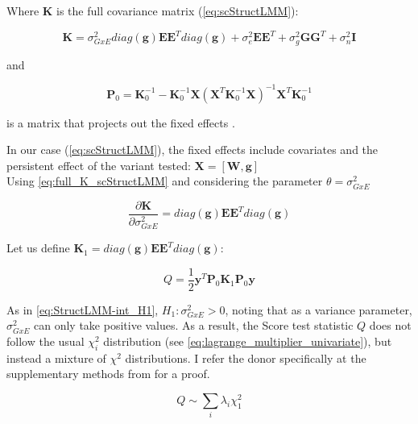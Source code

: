 Where $\mathbf{K}$ is the full covariance matrix (\eqref{eq:scStructLMM}):

\begin{equation}\label{eq:full_K_scStructLMM}
    \mathbf{K} = \sigma_{GxE}^2diag(\mathbf{g})\mathbf{E}\mathbf{E}^Tdiag(\mathbf{g}) +  \sigma_e^2 \mathbf{E}\mathbf{E}^T + \sigma_g^2 \mathbf{G}\mathbf{G}^T+ \sigma_n^2 \mathbf{I}
\end{equation}

and 

\begin{equation}
    \mathbf{P}_0 = \mathbf{K}_0^{-1}-\mathbf{K}_0^{-1}\mathbf{X}(\mathbf{X}^T\mathbf{K}_0^{-1}\mathbf{X})^{-1}\mathbf{X}^T\mathbf{K}_0^{-1}
\end{equation}

is a matrix that projects out the fixed effects \cite{lippert2011fast, lippert2014greater}.

In our case (\eqref{eq:scStructLMM}), the fixed effects include covariates and the persistent effect of the variant tested: $\mathbf{X} = [\mathbf{W}, \mathbf{g}]$\\

Using \eqref{eq:full_K_scStructLMM} and considering the parameter $\theta = \sigma_{GxE}^2$

\begin{equation}
    \frac{\partial \mathbf{K}}{\partial \sigma_{GxE}^2} = diag(\mathbf{g})\mathbf{E}\mathbf{E}^Tdiag(\mathbf{g})
\end{equation}

Let us define $\mathbf{K}_1 = diag(\mathbf{g})\mathbf{E}\mathbf{E}^Tdiag(\mathbf{g})$:

\begin{equation}
    Q = \frac{1}{2}\mathbf{y}^T\mathbf{P}_0 \mathbf{K}_1\mathbf{P}_0 \mathbf{y} 
\end{equation}

As in \eqref{eq:StructLMM-int_H1}, $H_1: \sigma_{GxE}^2>0$, noting that as a variance parameter, $\sigma_{GxE}^2$ can only take positive values.
As a result, the Score test statistic $Q$ does not follow the usual $\chi^2_i$ distribution (see \eqref{eq:lagrange_multiplier_univariate}), but instead a mixture of  $\chi^2$ distributions.
I refer the donor specifically at the supplementary methods from \cite{lippert2014greater} for a proof.

\begin{equation}
    Q \sim \sum_i \lambda_i \chi^2_1 
\end{equation}

